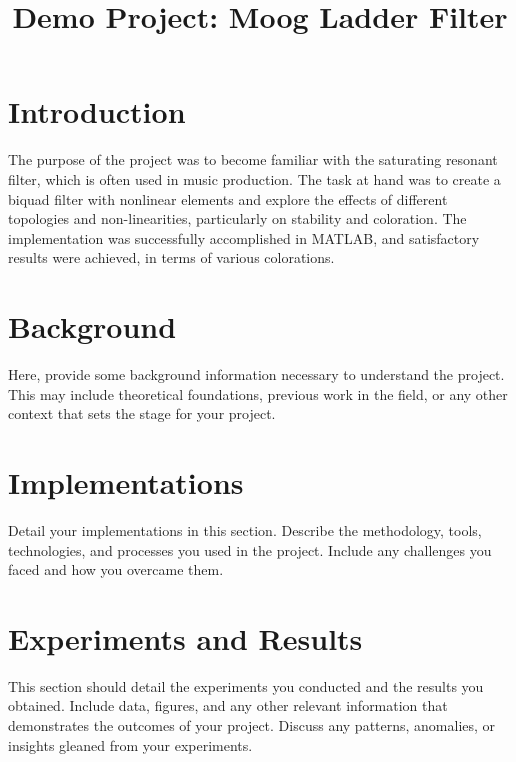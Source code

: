 \documentclass[notitlepage]{article}
\author{\vspace{-5ex}}
\date{\vspace{-5ex}}
\title{Demo Project: Moog Ladder Filter}         %
\begin{document}
\maketitle
\thispagestyle{fancy}


\section*{Introduction}
\label{sec:introduction}
The purpose of the project was to become familiar with the saturating resonant filter, which is often used in music production. The task at hand was to create a biquad filter with nonlinear elements and explore the effects of different topologies and non-linearities, particularly on stability and coloration. The implementation was successfully accomplished in MATLAB, and satisfactory results were achieved, in terms of various colorations.

\section*{Background}
\label{sec:background}
Here, provide some background information necessary to understand the project. This may include theoretical foundations, previous work in the field, or any other context that sets the stage for your project.

\section*{Implementations}
\label{sec:implementations}
Detail your implementations in this section. Describe the methodology, tools, technologies, and processes you used in the project. Include any challenges you faced and how you overcame them.

\section*{Experiments and Results}
\label{sec:experiments}
This section should detail the experiments you conducted and the results you obtained. Include data, figures, and any other relevant information that demonstrates the outcomes of your project. Discuss any patterns, anomalies, or insights gleaned from your experiments.
\end{document}
